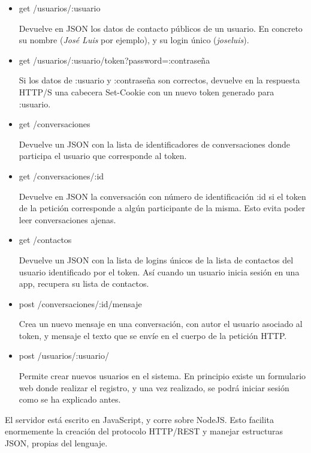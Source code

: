 \documentclass[]{article}
\begin{document}
\begin{itemize}
	\item get /usuarios/:usuario
	
	Devuelve en JSON los datos de contacto públicos de un usuario. En concreto su nombre (\textit{José Luis} por ejemplo), y su login único (\textit{joseluis}).
	
	\item get /usuarios/:usuario/token?password=:contraseña
	
	Si los datos de :usuario y :contraseña son correctos, devuelve en la respuesta HTTP/S una cabecera Set-Cookie con un nuevo token generado para :usuario.
	
	\item get /conversaciones
	
	Devuelve un JSON con la lista de identificadores de conversaciones donde participa el usuario que corresponde al token.
	
	\item get /conversaciones/:id
	
	Devuelve en JSON la conversación con número de identificación :id si el token de la petición corresponde a algún participante de la misma. Esto evita poder leer conversaciones ajenas.
	
	\item get /contactos
	
	Devuelve un JSON con la lista de logins únicos de la lista de contactos del usuario identificado por el token. Así cuando un usuario inicia sesión en una app, recupera su lista de contactos.
	
	\item post /conversaciones/:id/mensaje
	
	Crea un nuevo mensaje en una conversación, con autor el usuario asociado al token, y mensaje el texto que se envíe en el cuerpo de la petición HTTP.
	
	\item post /usuarios/:usuario/ %
	
	Permite crear nuevos usuarios en el sistema. En principio existe un formulario web donde realizar el registro, y una vez realizado, se podrá iniciar sesión como se ha explicado antes.
	
	
\end{itemize}


El servidor está escrito en JavaScript, y corre sobre NodeJS. Esto facilita enormemente la creación del protocolo HTTP/REST y manejar estructuras JSON, propias del lenguaje.
\end{document}
